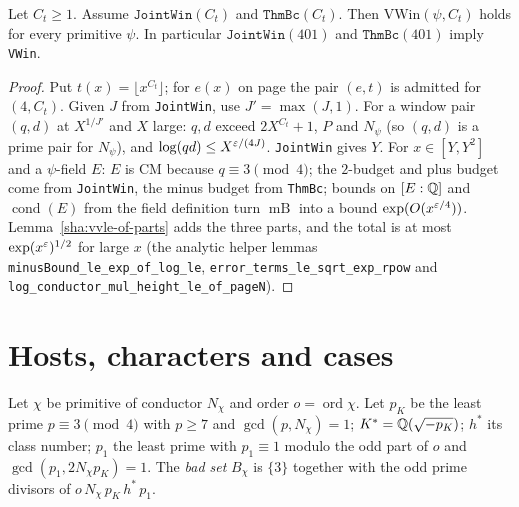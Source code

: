 \begin{theorem}\label{sha:vwin-of-joint}
Let $C_t\ge1$. Assume $\texttt{JointWin}(C_t)$ and $\texttt{ThmBc}(C_t)$. Then
$\mathrm{VWin}(\psi,C_t)$ holds for every primitive $\psi$. In particular
$\texttt{JointWin}(401)$ and $\texttt{ThmBc}(401)$ imply \texttt{VWin}.
\end{theorem}
\begin{proof}
Put $t(x)=\lfloor x^{C_t}\rfloor$; for $e(x)$ on page the pair $(e,t)$ is admitted for
$(4,C_t)$. Given $J$ from \texttt{JointWin}, use $J'=\max(J,1)$. For a window pair
$(q,d)$ at $X^{1/J'}$ and $X$ large: $q,d$ exceed $2X^{C_t}+1$, $P$ and $N_{\psi}$ (so
$(q,d)$ is a prime pair for $N_{\psi}$), and $\log(qd)\le X^{\varepsilon/(4J)}$. \texttt{JointWin}
gives $Y$. For $x\in[Y,Y^2]$ and a $\psi$-field $E$: $E$ is CM because $q\equiv3\pmod4$;
the $2$-budget and plus budget come from \texttt{JointWin}, the minus budget from
\texttt{ThmBc}; bounds on $[E:\mathbb{Q}]$ and $\operatorname{cond}(E)$ from the field definition
turn $\operatorname{mB}$ into a bound $\exp(O(x^{\varepsilon/4}))$. Lemma~\ref{sha:vvle-of-parts}
adds the three parts, and the total is at most $\exp(x^{\varepsilon})^{1/2}$ for large $x$ (the
analytic helper lemmas \texttt{minusBound\_le\_exp\_of\_log\_le},
\texttt{error\_terms\_le\_sqrt\_exp\_rpow} and \texttt{log\_conductor\_mul\_height\_le\_of\_pageN}).
\end{proof}

\section{Hosts, characters and cases}

\begin{definition}\label{sha:bchi}
Let $\chi$ be primitive of conductor $N_{\chi}$ and order $o=\operatorname{ord}\chi$. Let
$p_K$ be the least prime $p\equiv3\pmod4$ with $p\ge7$ and $\gcd(p,N_{\chi})=1$;
$K^*=\mathbb{Q}(\sqrt{-p_K})$; $h^*$ its class number; $p_1$ the least prime with
$p_1\equiv1$ modulo the odd part of $o$ and $\gcd(p_1,2N_{\chi} p_K)=1$. The \emph{bad set}
$B_{\chi}$ is $\{3\}$ together with the odd prime divisors of $o\,N_{\chi}\,p_K\,h^*\,p_1$.
\end{definition}

